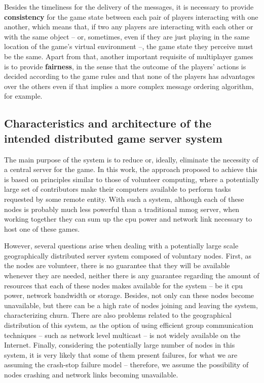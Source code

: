 \documentclass[]{usiinfprospectus}
\begin{document}
Besides the timeliness for the delivery of the messages, it is necessary to provide \textbf{consistency} for the game state between each pair of players interacting with one another, which means that, if two any players are interacting with each other or with the same object -- or, sometimes, even if they are just playing in the same location of the game's virtual environment --, the game state they perceive must be the same. Apart from that, another important requisite of multiplayer games is to provide \textbf{fairness}, in the sense that the outcome of the players' actions is decided according to the game rules and that none of the players has advantages over the others even if that implies a more complex message ordering algorithm, for example.


\subsection{Characteristics and architecture of the intended distributed game server system} \label{sec:feats}

The main purpose of the system is to reduce or, ideally, eliminate the necessity of a central server for the game. In this work, the approach proposed to achieve this is based on principles similar to those of volunteer computing, where a potentially large set of contributors make their computers available to perform tasks requested by some remote entity. With such a system, although each of these nodes is probably much less powerful than a traditional mmog server, when working together they can sum up the cpu power and network link necessary to host one of these games.

However, several questions arise when dealing with a potentially large scale geographically distributed server system composed of voluntary nodes. First, as the nodes are volunteer, there is no guarantee that they will be available whenever they are needed, neither there is any guarantee regarding the amount of resources that each of these nodes makes available for the system -- be it cpu power, network bandwidth or storage. Besides, not only can these nodes become unavailable, but there can be a high rate of nodes joining and leaving the system, characterizing churn. There are also problems related to the geographical distribution of this system, as the option of using efficient group communication techniques -- such as network level multicast -- is not widely available on the Internet. Finally, considering the potentially large number of nodes in this system, it is very likely that some of them present failures, for what we are assuming the crash-stop failure model -- therefore, we assume the possibility of nodes crashing and network links becoming unavailable.
\end{document}
